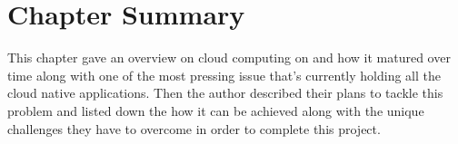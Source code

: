 \section{Chapter Summary}

This chapter gave an overview on cloud computing on and how it matured over time along with one of the most pressing issue that's currently holding all the cloud native applications. Then the author described their plans to tackle this problem and listed down the how it can be achieved along with the unique challenges they have to overcome in order to complete this project.

